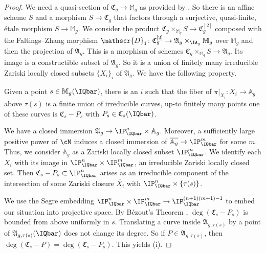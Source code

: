 \begin{proof}
  We need a quasi-section of
  $\mathfrak{C}_g\rightarrow\mathbb{M}_g$ as provided by \cite[Corollaire~17.16.3(ii)]{EGAIV}.
  So there is an affine scheme $S$
  and a morphism $S\rightarrow \mathfrak{C}_g$ that factors through a
  surjective, quasi-finite, \'etale morphism $ S\rightarrow
  \mathbb{M}_g$. We consider the product
  $\mathfrak{C}_g\times_{\mathbb{M}_g} S\rightarrow
  \mathfrak{C}_g^{[2]}$ composed with the Faltings--Zhang morphism
  $\mathscr{D}_1\colon
  \mathfrak{C}_g^{[2]}\rightarrow\mathfrak{A}_g\times_{\IA_g}
  \mathbb{M}_g$ over $\mathbb{M}_g$ and then the projection of
  $\mathfrak{A}_g$. This is a morphism of schemes
  $\mathfrak{C}_g\times_{\mathbb{M}_g} S\rightarrow
  \mathfrak{A}_g$. Its
  image is a constructible subset of $\mathfrak{A}_g$.
  So it is a union of finitely many
  irreducible Zariski locally closed subsets $\{X_i\}_i$ of
  $\mathfrak{A}_g$. We have
  the following property. %

  Given a point $s\in \mathbb{M}_g(\IQbar)$, there is an $i$ such that
  the fiber of $\pi|_{X_i}\colon X_i \rightarrow\mathbb{A}_g$ above
  $\tau(s)$ is a finite union of irreducible curves, up-to finitely
  many points one of these curves is
  $\mathfrak{C}_s-P_s$ with $P_s\in \mathfrak{C}_s(\IQbar)$.


  We  have a closed immersion $\mathfrak{A}_g\rightarrow \IP_\IQbar^n
  \times \mathbb{A}_g$.
  Moreover, a sufficiently  large positive power of $\cM$ induces a
  closed immersion of $\overline{\mathbb{A}_g}\rightarrow\IP_\IQbar^m$
   for some $m$.
  Thus, we consider $\mathbb{A}_g$ as a
  Zariski locally closed subset
  $\IP_\IQbar^m$. We identify each
  $X_i$ with its image in $\IP^n_\IQbar\times
  \IP^m_\IQbar$, an irreducible  Zariski locally closed set.  Then
  $\mathfrak{C}_s-P_s \subset\IP^n_\IQbar$ arises as an irreducible
  component of the intersection of some Zariski
  closure $\overline{X_i}$
   with $\IP^n_\IQbar\times
  \{\tau(s)\}$.

  We use the Segre embedding
  $\IP_\IQbar^n\times\IP_\IQbar^m\rightarrow \IP_\IQbar^{(n+1)(m+1)-1}$
  to embed our situation into projective space. By B\'ezout's Theorem
  \cite[Example~8.4.6]{Fulton},
  $\deg(\mathfrak{C}_s-P_s)$ is bounded from above uniformly in $s$.
  Translating a curve inside $\mathfrak{A}_{g,\tau(s)}$ by a point of
  $\mathfrak{A}_{g,\tau(s)}(\IQbar)$ does not
  change its degree. So if $P\in \mathfrak{A}_{g,\tau(s)}$, then
  $\deg(\mathfrak{C}_s-P)=\deg(\mathfrak{C}_s-P_s)$.
  This yields (i).


\end{proof}
